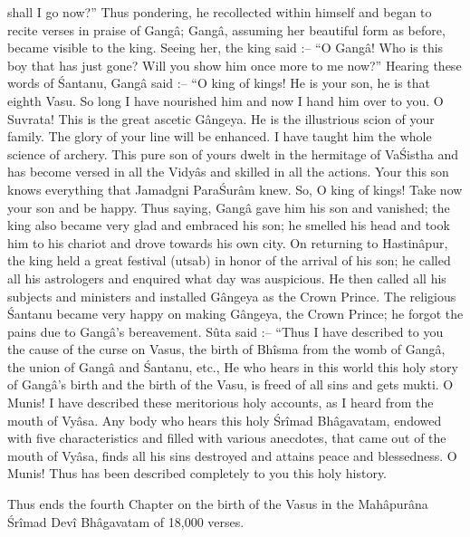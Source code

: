 shall I go now?'' Thus pondering, he recollected within himself and began to recite verses in praise of Gang\^a; Gang\^a, assuming her beautiful form as before, became visible to the king. Seeing her, the king said :-- ``O Gang\^a! Who is this boy that has just gone? Will you show him once more to me now?'' Hearing these words of \'Santanu, Gang\^a said :-- ``O king of kings! He is your son, he is that eighth Vasu. So long I have nourished him and now I hand him over to you. O Suvrata! This is the great ascetic G\^angeya. He is the illustrious scion of your family. The glory of your line will be enhanced. I have taught him the whole science of archery. This pure son of yours dwelt in the hermitage of Va\'Sistha and has become versed in all the Vidy\^as and skilled in all the actions. Your this son knows everything that Jamadgni Para\'Sur\^am knew. So, O king of kings! Take now your son and be happy. Thus saying, Gang\^a gave him his son and vanished; the king also became very glad and embraced his son; he smelled his head and took him to his chariot and drove towards his own city. On returning to Hastin\^apur, the king held a great festival (utsab) in honor of the arrival of his son; he called all his astrologers and enquired what day was auspicious. He then called all his subjects and ministers and installed G\^angeya as the Crown Prince. The religious \'Santanu became very happy on making G\^angeya, the Crown Prince; he forgot the pains due to Gang\^a's bereavement. S\^uta said :-- ``Thus I have described to you the cause of the curse on Vasus, the birth of Bh\^isma from the womb of Gang\^a, the union of Gang\^a and \'Santanu, etc., He who hears in this world this holy story of Gang\^a's birth and the birth of the Vasu, is freed of all sins and gets mukti. O Munis! I have described these meritorious holy accounts, as I heard from the mouth of Vy\^asa. Any body who hears this holy \'Sr\^imad Bh\^agavatam, endowed with five characteristics and filled with various anecdotes, that came out of the mouth of Vy\^asa, finds all his sins destroyed and attains peace and blessedness. O Munis! Thus has been described completely to you this holy history.

Thus ends the fourth Chapter on the birth of the Vasus in the Mah\^apur\^ana \'Sr\^imad Dev\^i Bh\^agavatam of 18,000 verses.

